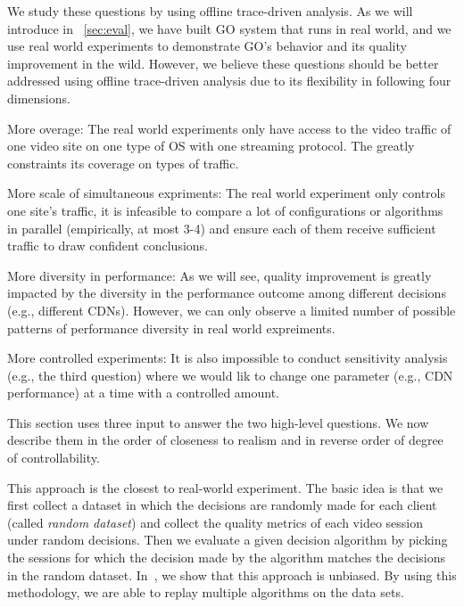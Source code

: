 We study these questions by using offline trace-driven analysis. As we will introduce in \Section~\ref{sec:eval}, we have built GO system that runs in real world, and we use real world experiments to demonstrate GO's behavior and its quality improvement in the wild. However, we believe these questions should be better addressed using offline trace-driven analysis due to its flexibility in following four dimensions.
\begin{packedenumerate}
	\item More overage: The real world experiments only have access to the video traffic of one video site on one type of OS with one streaming protocol. The greatly constraints its coverage on types of traffic.
	\item More scale of simultaneous expriments: The real world experiment only controls one site's traffic, it is infeasible to compare a lot of configurations or algorithms in parallel (empirically, at most 3-4) and ensure each of them receive sufficient traffic to draw confident conclusions.
	\item More diversity in performance: As we will see, quality improvement is greatly impacted by the diversity in the performance outcome among different decisions (e.g., different CDNs). However, we can only observe a limited number of possible patterns of performance diversity in real world expreiments.
	\item More controlled experiments: It is also impossible to conduct sensitivity analysis (e.g., the third question) where we would lik to change one parameter (e.g., CDN performance) at a time with a controlled amount.
\end{packedenumerate}


This section uses three input to answer the two high-level questions. We now describe them in the order of closeness to realism and in reverse order of degree of controllability.

 This approach is the closest to real-world experiment. The basic idea is that we first collect a dataset in which the decisions are randomly made for each client (called {\it random dataset}) and collect the quality metrics of each video session under random decisions. Then we evaluate a given decision algorithm by picking the sessions for which the decision made by the algorithm matches the decisions in the random dataset. In~\cite{technicalreport}, we show that this approach is unbiased. 
By using this methodology, we are able to replay multiple algorithms on the data sets.

